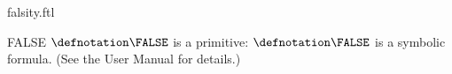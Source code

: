 \documentclass{stex}
\begin{document}
\begin{smodule}{falsity.ftl}


\begin{documentation}{FALSE}
  $\defnotation\FALSE$ is a \Naproche primitive:
  $\defnotation\FALSE$ is a symbolic formula.
  (See the \Naproche User Manual for details.)
\end{documentation}

\end{smodule}
\end{document}
